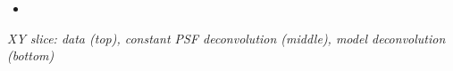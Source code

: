 \documentclass[a0paper,portrait,fontscale=0.35]{baposter}
\newcommand{\mycaption}[1]{
  {
    \smaller
    \emph{#1}
  }
}
\theoremstyle{plain}
\theoremstyle{plain}
\theoremstyle{definition}
\theoremstyle{plain}
\theoremstyle{definition}
\begin{document}
\begin{poster}
{\begin{minipage}[t]{0.51\textwidth}
\begin{minipage}[t]{0.49\textwidth}
\begin{itemize}
        \item
      \end{itemize}
    \end{minipage}
    \begin{minipage}[t]{0.49\textwidth}
      \centering

      \vspace{-1em}
      \begin{center}
        \mycaption{
          XY slice: 
          data (top), constant PSF deconvolution (middle),
          model deconvolution (bottom)
        }
      \end{center}

      \vspace{-0.5em}
      \centering


\end{minipage}
\end{minipage}}
\end{poster}
\end{document}
